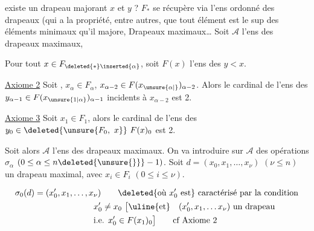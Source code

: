 
existe un drapeau majorant $x$ et $y$ ?    $F_*$ se récupère via l'ens ordonné des drapeaux (qui a la propriété, entre autres, que tout élément est le sup des éléments minimaux qu'il majore,   Drapeaux maximaux\ldots{} Soit $\mathcal A$ l'ens des drapeaux maximaux,


 Pour tout $x\in F_{\deleted{*}\inserted{\alpha}}$, soit $F(x)$ l'ens des $y<x$.  

\uline{Axiome 2} Soit , $x_\alpha\in F_\alpha$, $x_{\alpha-2}\in F(x_{\unsure{\alpha|{}}})_{\alpha-2}$. Alors  le cardinal de l'ens des $y_{\alpha-1}\in F(x_{\unsure{1|\alpha}})_{\alpha-1}$ incidents à $x_{\alpha-2}$ est 2.


\uline{Axiome 3} Soit $x_1\in F_1$, alors le cardinal de l'ens des $y_0\in\deleted{\unsure{F_0,\ x}}\ F(x)_0$  est 2.


 Soit alors $\mathcal A$ l'ens des drapeaux maximaux.  On va introduire sur $\mathcal A$ des opérations $\sigma_\alpha$ $(0\leq\alpha\leq n\deleted{\unsure{\}}}-1)$. Soit $d=(x_0,x_1,\ldots,x_\nu)$ $(\nu\leq n)$ un drapeau maximal, avec $x_i\in F_i$ $(0\leq i\leq\nu)$.

\[
\begin{aligned}
\sigma_0(d)&=(x'_0,x_1,\ldots,x_\nu)\qquad\deleted{\text{où }x'_0\text{ est}}\ \text{caractérisé par la condition}\\
&\hspace{7em}x'_0\ne x_0\ \big[\text{\uline{et}}\quad(x'_0,x_1,\ldots x_\nu)\ \text{un drapeau}\\
&\hspace{7em}\text{i.e. }x'_0\in F(x_1)_0\big]\qquad\text{cf Axiome 2}
\end{aligned}
\]

